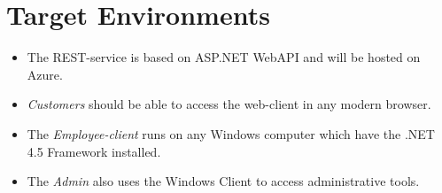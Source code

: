 \section{Target Environments}
\begin{itemize}
	\item The REST-service is based on ASP.NET WebAPI and will be hosted on Azure.
	\item \emph{Customers} should be able to access the web-client in any modern browser.
	\item The \emph{Employee-client} runs on any Windows computer which have the .NET 4.5 Framework installed.
	\item The \emph{Admin} also uses the Windows Client to access administrative tools.
\end{itemize}